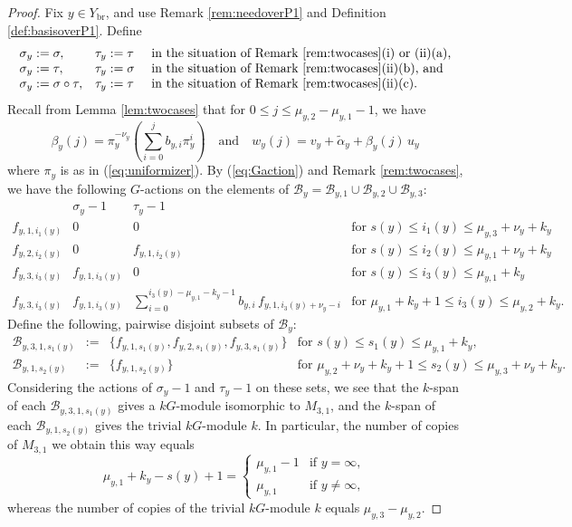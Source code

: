 \documentclass{amsart}
\numberwithin{equation}{section}
\numberwithin{table}{section}
\theoremstyle{plain}
\theoremstyle{definition}
\theoremstyle{remark}
\begin{document}
\begin{proof} 
Fix $y\in Y_{\mathrm{br}}$, and use Remark \ref{rem:needoverP1} and Definition \ref{def:basisoverP1}. Define 
$$\begin{array}{lll}
\sigma_y:=\sigma, & \tau_y:=\tau &\mbox{ in the situation of Remark \ref{rem:twocases}(i) or (ii)(a),}\\
\sigma_y:=\tau, & \tau_y:=\sigma &\mbox{ in the situation of Remark \ref{rem:twocases}(ii)(b), and}\\
\sigma_y:=\sigma\circ\tau, & \tau_y:=\tau &\mbox{ in the situation of Remark \ref{rem:twocases}(ii)(c).}
\end{array}$$
Recall from Lemma \ref{lem:twocases} that for $0\le j \le \mu_{y,2}-\mu_{y,1}-1$, we have 
$$\beta_y(j) = \pi_y^{-\nu_y} \left(\sum_{i=0}^{j} b_{y,i}\pi_y^i\right)\quad\mbox{and}\quad
w_y(j) = v_y +\widetilde{\alpha}_y + \beta_y(j) \,u_y$$
where $\pi_y$ is as in (\ref{eq:uniformizer}). By (\ref{eq:Gaction}) and Remark \ref{rem:twocases}, we have the following $G$-actions on the elements of $\mathcal{B}_y = \mathcal{B}_{y,1} \cup \mathcal{B}_{y,2} \cup \mathcal{B}_{y,3}$: 
$$\begin{array}{c||c|c||l}
 & \sigma_y -1 & \tau_y -1\\ \hline\hline
f_{y,1,i_1(y)} & 0 & 0 & \mbox{for } s(y) \le i_1(y) \le \mu_{y,3} + \nu_y + k_y\\
f_{y,2,i_2(y)} & 0 & f_{y,1,i_2(y)} & \mbox{for } s(y) \le i_2(y) \le \mu_{y,1} + \nu_y + k_y \\
f_{y,3,i_3(y)} & f_{y,1,i_3(y)} & 0 & \mbox{for } s(y) \le i_3(y) \le \mu_{y,1}  + k_y\\
f_{y,3,i_3(y)} & f_{y,1,i_3(y)} & \displaystyle{\sum_{i=0}^{i_3(y)-\mu_{y,1} - k_y - 1} b_{y,i} \,f_{y,1,i_3(y)+\nu_y-i}} 
& \mbox{for } \mu_{y,1}  + k_y + 1 \le i_3(y) \le \mu_{y,2} + k_y.
\end{array}$$
Define the following, pairwise disjoint subsets of $\mathcal{B}_y$:
$$\begin{array}{rcll}
\mathcal{B}_{y,3,1,s_1(y)} &:=& \{f_{y,1,s_1(y)}, f_{y,2,s_1(y)},f_{y,3,s_1(y)}\} & \mbox{for } s(y)\le s_1(y)\le \mu_{y,1}+k_y,\\
\mathcal{B}_{y,1,s_2(y)} &:=& \{f_{y,1,s_2(y)}\} & \mbox{for } \mu_{y,2}  + \nu_y + k_y + 1 \le s_2(y) \le \mu_{y,3}  + \nu_y + k_y.
\end{array}$$
Considering the actions of $\sigma_y-1$ and $\tau_y-1$ on these sets, we see that the $k$-span of each $\mathcal{B}_{y,3,1,s_1(y)}$ gives a $kG$-module isomorphic to $M_{3,1}$, and the $k$-span of each $\mathcal{B}_{y,1,s_2(y)}$ gives the trivial $kG$-module $k$. In particular, the number of copies of $M_{3,1}$ we obtain this way equals
$$\mu_{y,1}+k_y-s(y)+1=\left\{\begin{array}{ll} \mu_{y,1}-1 & \mbox{if } y=\infty,\\
\mu_{y,1} & \mbox{if } y\neq \infty,
\end{array}\right.$$
whereas the number of copies of the trivial $kG$-module $k$ equals $\mu_{y,3}-\mu_{y,2}$.


\end{proof}
\end{document}
